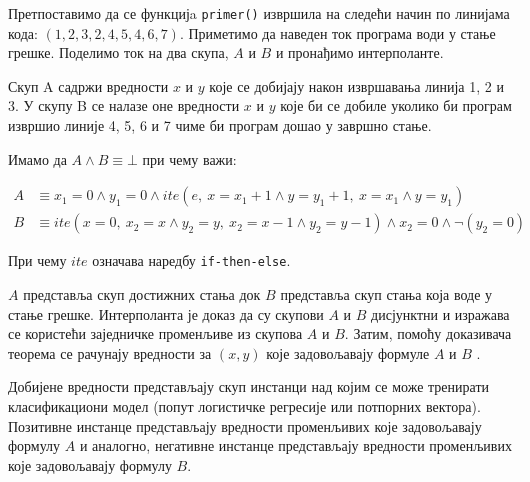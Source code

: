 \documentclass[a4paper]{article}
\begin{document}
{%

Претпоставимо да се функцијa \texttt{primer()} извршила на следећи начин по линијама кода: $(1, 2, 3, 2, 4, 5, 4, 6, 7)$. Приметимо
да наведен ток програма води у стање грешке. Поделимо ток на два скупа, $A$ и $B$ и пронађимо интерполанте.

Скуп A садржи вредности $x$ и $y$ које се добијају након извршавања линија 1, 2 и 3. У скупу B се налазе оне вредности $x$ и $y$
које би се добиле уколико би програм извршио линије 4, 5, 6 и 7 чиме би програм дошао у завршно стање.

Имамо да $A \land B \equiv \bot$ при чему важи:

\begin{equation*}
\begin{split}
    A & \equiv x_1 = 0 \land y_1 = 0 \land ite(e,\ x = x_1 + 1 \land y = y_1 + 1, \ x = x_1 \land y = y_1)     \\
    B & \equiv ite(x = 0,\ x_2 = x \land y_2 = y,\ x_2 = x - 1 \land y_2 = y-1) \land x_2 = 0 \land \neg (y_2 = 0)
\end{split}
\end{equation*}

При чему $ite$ означава наредбу \texttt{if-then-else}.

$A$ представља скуп достижних стања док $B$ представља скуп стања која воде у стање грешке. Интерполанта је доказ да су
скупови $A$ и $B$ дисјунктни и изражава се користећи заједничке променљиве из скупова $A$ и $B$. Затим, помоћу доказивача теорема се рачунају вредности за $(x, y)$ које задовољавају формуле $A$ и $B$ \cite{Sharma_interpolantsas}.

Добијене вредности представљају скуп инстанци над којим се може тренирати класификациони модел (попут логистичке регресије или потпорних вектора).
Позитивне инстанце представљају вредности променљивих које задовољавају формулу $A$ и аналогно, негативне инстанце представљају вредности
променљивих које задовољавају формулу $B$.

}
\end{document}
